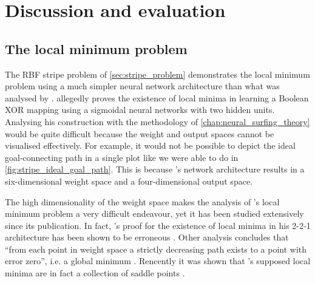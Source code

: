 \chapter{Discussion and evaluation}

\section{The local minimum problem}
The RBF stripe problem of \ref{sec:stripe_problem} demonstrates the local minimum problem using a much simpler neural network architecture than what was analysed by \textcite{blum1989}. 
\citeauthor{blum1989} allegedly proves the existence of local minima in learning a Boolean XOR mapping using a sigmoidal neural networks with two hidden units.
Analysing his construction with the methodology of \ref{chap:neural_surfing_theory} would be quite difficult because the weight and output spaces cannot be visualised effectively.
For example, it would not be possible to depict the ideal goal-connecting path in a single plot like we were able to do in \ref{fig:stripe_ideal_goal_path}.
This is because \citeauthor{blum1989}'s network architecture results in a six-dimensional weight space and a four-dimensional output space. 

The high dimensionality of the weight space makes the analysis of \citeauthor{blum1989}'s local minimum problem a very difficult endeavour, yet it has been studied extensively since its publication.
In fact, \citeauthor{blum1989}'s proof for the existence of local minima in his 2-2-1 architecture has been shown to be erroneous \cite{hamey1998}. 
Other analysis concludes that ``from each point in weight space a strictly decreasing path exists to a point with error zero'', i.e. a global minimum \cite*{sprinkhuizen1999}.
Rencently it was shown that \citeauthor{blum1989}'s supposed local minima are in fact a collection of saddle points \cite{mizutani2010}.


